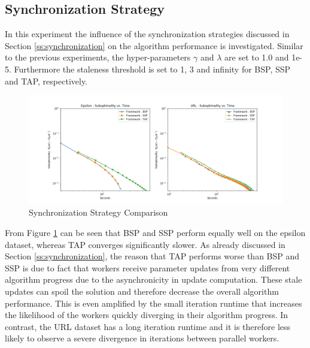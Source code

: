 \subsection{Synchronization Strategy}
In this experiment the influence of the synchronization strategies discussed in Section \ref{ss:synchronization} on the algorithm performance is investigated.
Similar to the previous experiments, the hyper-parameters $\gamma$ and $\lambda$ are set to 1.0 and 1e-5.
Furthermore the staleness threshold is set to 1, 3 and infinity for BSP, SSP and TAP, respectively.
\begin{figure}[ht]
\centering
\includegraphics[width=1.0\textwidth]{img/sync_strat_cmp.png}
\caption{Synchronization Strategy Comparison}
\label{fig:sync_strat_cmp}
\end{figure}
From Figure \ref{fig:sync_strat_cmp} can be seen that BSP and SSP perform equally well on the epsilon dataset, whereas TAP converges significantly slower.
As already discussed in Section \ref{ss:synchronization}, the reason that TAP performs worse than BSP and SSP is due to fact that workers receive parameter updates from very different algorithm progress due to the asynchronicity in update computation.
These stale updates can spoil the solution and therefore decrease the overall algorithm performance.
This is even amplified by the small iteration runtime that increases the likelihood of the workers quickly diverging in their algorithm progress.
In contrast, the URL dataset has a long iteration runtime and it is therefore less likely to observe a severe divergence in iterations between parallel workers.
